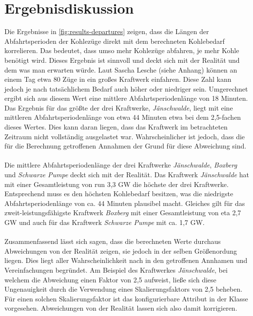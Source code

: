\section{Ergebnisdiskussion}

Die Ergebnisse in \autoref{fig:results-departures} zeigen, dass die Längen der Abfahrtsperioden der Kohlezüge direkt mit dem berechneten Kohlebedarf korrelieren. Das bedeutet, dass umso mehr Kohlezüge abfahren, je mehr Kohle benötigt wird. Dieses Ergebnis ist sinnvoll und deckt sich mit der Realität und dem was man erwarten würde. Laut Sascha Lesche (siehe Anhang) können an einem Tag etwa 80 Züge in ein großes Kraftwerk einfahren. Diese Zahl kann jedoch je nach tatsächlichem Bedarf auch höher oder niedriger sein. Umgerechnet ergibt sich aus diesem Wert eine mittlere Abfahrtsperiodenlänge von 18 Minuten. Das Ergebnis für das größte der drei Kraftwerke, \emph{Jänschwalde}, liegt mit eine mittleren Abfahrtsperiodenlänge von etwa 44 Minuten etwa bei dem 2,5-fachen dieses Wertes. Dies kann daran liegen, dass das Kraftwerk im betrachteten Zeitraum nicht vollständig ausgelastet war. Wahrscheinlicher ist jedoch, dass die für die Berechnung getroffenen Annahmen der Grund für diese Abweichung sind.\\
\\
Die mittlere Abfahrtsperiodenlänge der drei Kraftwerke \emph{Jänschwalde}, \emph{Boxberg} und \emph{Schwarze Pumpe} deckt sich mit der Realität. Das Kraftwerk \emph{Jänschwalde} hat mit einer Gesamtleistung von run 3,3 GW die höchste der drei Kraftwerke. Entsprechend muss es den höchsten Kohlebedarf besitzen, was die niedrigste Abfahrtsperiodenlänge von ca. 44 Minuten plausibel macht. Gleiches gilt für das zweit-leistungsfähigste Kraftwerk \emph{Boxberg} mit einer Gesamtleistung von eta 2,7 GW und auch für das Kraftwerk \emph{Schwarze Pumpe} mit ca. 1,7 GW. \cite{noauthor_bundesnetzagentur_nodate}\\
\\
Zusammenfassend lässt sich sagen, dass die berechneten Werte durchaus Abweichungen von der Realität zeigen, sie jedoch in der selben Größenordung liegen. Dies liegt aller Wahrscheinlichkeit nach in den getroffenen Annhamen und Vereinfachungen begründet. Am Beispiel des Kraftwerkes \emph{Jänschwalde}, bei welchem die Abweichung einen Faktor von 2,5 aufweist, ließe sich diese Ungenauigkeit durch die Verwendung eines Skalierungsfaktors von 2,5 beheben. Für einen solchen Skalierungsfaktor ist das konfigurierbare Attribut  in der Klasse  vorgesehen. Abweichungen von der Realität lassen sich also damit korrigieren.